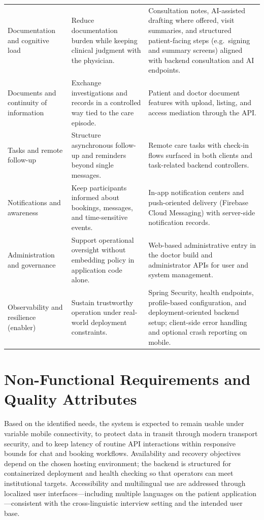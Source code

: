 \begin{longtable}{@{}>{\RaggedRight\arraybackslash}p{2.4cm}>{\RaggedRight\arraybackslash}p{4.8cm}>{\RaggedRight\arraybackslash}p{5.6cm}@{}}
Documentation and cognitive load & Reduce documentation burden while keeping clinical judgment with the physician. & Consultation notes, AI-assisted drafting where offered, visit summaries, and structured patient-facing steps (e.g.\ signing and summary screens) aligned with backend consultation and AI endpoints.\\
Documents and continuity of information & Exchange investigations and records in a controlled way tied to the care episode. & Patient and doctor document features with upload, listing, and access mediation through the API.\\
Tasks and remote follow-up & Structure asynchronous follow-up and reminders beyond single messages. & Remote care tasks with check-in flows surfaced in both clients and task-related backend controllers.\\
Notifications and awareness & Keep participants informed about bookings, messages, and time-sensitive events. & In-app notification centers and push-oriented delivery (Firebase Cloud Messaging) with server-side notification records.\\
Administration and governance & Support operational oversight without embedding policy in application code alone. & Web-based administrative entry in the doctor build and administrator APIs for user and system management.\\
Observability and resilience (enabler) & Sustain trustworthy operation under real-world deployment constraints. & Spring Security, health endpoints, profile-based configuration, and deployment-oriented backend setup; client-side error handling and optional crash reporting on mobile.\\
\bottomrule
\end{longtable}
\normalsize

\section{Non-Functional Requirements and Quality Attributes}

Based on the identified needs, the system is expected to remain usable under variable mobile connectivity, to protect data in transit through modern transport security, and to keep latency of routine API interactions within responsive bounds for chat and booking workflows. Availability and recovery objectives depend on the chosen hosting environment; the backend is structured for containerized deployment and health checking so that operators can meet institutional targets. Accessibility and multilingual use are addressed through localized user interfaces---including multiple languages on the patient application---consistent with the cross-linguistic interview setting and the intended user base.

